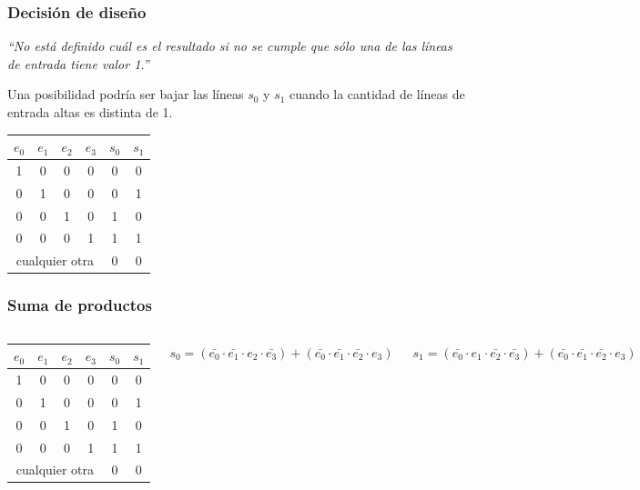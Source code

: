\documentclass[spanish]{beamer}
\begin{document}
\begin{frame}
  \frametitle{Decisión de diseño}

  \textit{``No está definido cuál es el resultado si no se cumple que sólo una
  de las líneas de entrada tiene valor 1.''}

  \pause

  \vspace{1em}

  Una posibilidad podría ser bajar las líneas $s_0$ y $s_1$ cuando la cantidad
  de líneas de entrada altas es distinta de 1.

  \pause

  \begin{center}
    \begin{tabular}{c|c|c|c||c|c}
      $e_0$ & $e_1$ & $e_2$ & $e_3$ & $s_0$ & $s_1$ \\
      \hline
      1 & 0 & 0 & 0 & 0 & 0 \\
      0 & 1 & 0 & 0 & 0 & 1 \\
      0 & 0 & 1 & 0 & 1 & 0 \\
      0 & 0 & 0 & 1 & 1 & 1 \\
      \hline
      \multicolumn{4}{c||}{cualquier otra} & 0 & 0 \\
    \end{tabular}
  \end{center}
\end{frame}

\begin{frame}
  \frametitle{Suma de productos}

  \begin{columns}

    \begin{center}
      \begin{tabular}{c|c|c|c||c|c}
        $e_0$ & $e_1$ & $e_2$ & $e_3$ & $s_0$ & $s_1$ \\
        \hline
        1 & 0 & 0 & 0 & 0 & 0 \\
        0 & 1 & 0 & 0 & 0 & 1 \\
        0 & 0 & 1 & 0 & 1 & 0 \\
        0 & 0 & 0 & 1 & 1 & 1 \\
        \hline
        \multicolumn{4}{c||}{cualquier otra} & 0 & 0 \\
      \end{tabular}
    \end{center}

    \pause


    $s_0 = (\bar{e_0} \cdot \bar{e_1} \cdot e_2 \cdot \bar{e_3}) +
           (\bar{e_0} \cdot \bar{e_1} \cdot \bar{e_2} \cdot e_3)$

    \pause

    $s_1 = (\bar{e_0} \cdot e_1 \cdot \bar{e_2} \cdot \bar{e_3}) +
           (\bar{e_0} \cdot \bar{e_1} \cdot \bar{e_2} \cdot e_3)$


  \end{columns}

\end{frame}
\end{document}
